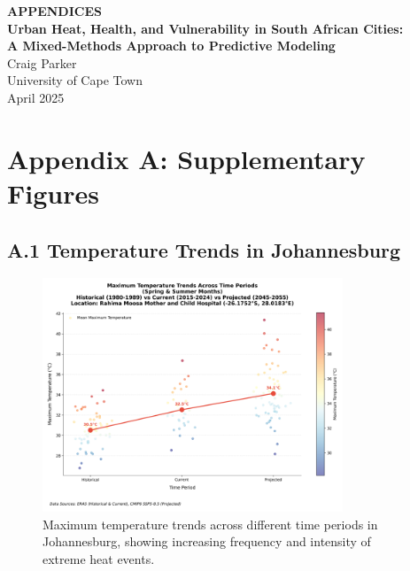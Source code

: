 \documentclass[12pt,a4paper,landscape]{article}
\begin{document}
\begin{center}
    \Large\textbf{APPENDICES}\\[0.5em]
    \large\textbf{Urban Heat, Health, and Vulnerability in South African Cities:}\\
    \large\textbf{A Mixed-Methods Approach to Predictive Modeling}\\[0.5em]
    \normalsize Craig Parker\\
    \normalsize University of Cape Town\\
    \normalsize April 2025
\end{center}

\section*{Appendix A: Supplementary Figures}

\subsection*{A.1 Temperature Trends in Johannesburg}
\begin{figure}[H]
    \centering
    \includegraphics[width=0.8\textwidth]{images/Max_temp_trends_across_time_periods.png}
    \caption{Maximum temperature trends across different time periods in Johannesburg, showing increasing frequency and intensity of extreme heat events.}
    \label{fig:temp_trends}
\end{figure}
\end{document}
